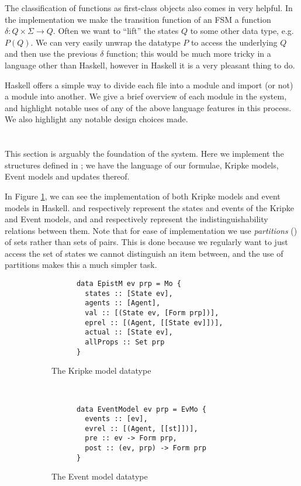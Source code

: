 \documentclass[10pt, a4paper]{report}
\begin{document}
The classification of functions as first-class objects also comes in very
helpful. In the implementation we make the transition function of an FSM a
function $\delta : Q \times \Sigma \rightarrow Q$. Often we want to ``lift'' the
states $Q$ to some other data type, e.g. $P (Q)$. We can very easily unwrap the
datatype $P$ to access the underlying $Q$ and then use the previous $\delta$
function; this would be much more tricky in a language other than Haskell,
however in Haskell it is a very pleasant thing to do.

\bigskip

Haskell offers a simple way to divide each file into a module and import (or
not) a module into another. We give a brief overview of each module in the
system, and highlight notable uses of any of the above language features in this
process. We also highlight any notable design choices made. 

\section{}

This section is arguably the foundation of the system. Here we implement the
structures defined in ; we have the language of our formulae,
Kripke models, Event models and updates thereof.  

In Figure \ref{fig:HaskellModels}, we can see the implementation of both Kripke
models and event models in Haskell.  and 
respectively represent the states and events of the Kripke and Event models, and
 and  respectively represent the
indistinguishability relations between them. Note that for ease of
implementation we use \emph{partitions} (\cite{EREL}) of sets rather than sets
of pairs. This is done because we regularly want to just access the set of
states we cannot distinguish an item between, and the use of partitions makes
this a much simpler task. 

\begin{figure}[h]
  \centering
  \begin{subfigure}[b]{0.5\textwidth}
    \begin{verbatim}
      data EpistM ev prp = Mo {
        states :: [State ev],                  
        agents :: [Agent],              
        val :: [(State ev, [Form prp])],         
        eprel :: [(Agent, [[State ev]])],
        actual :: [State ev],              
        allProps :: Set prp
      }
    \end{verbatim}
    \caption{The Kripke model datatype}
  \end{subfigure}%
~
  \begin{subfigure}[b]{0.5\textwidth}
    \begin{verbatim}
      data EventModel ev prp = EvMo {
        events :: [ev],
        evrel :: [(Agent, [[st]])],
        pre :: ev -> Form prp,
        post :: (ev, prp) -> Form prp
      }
    \end{verbatim}
    \caption{The Event model datatype}
  \end{subfigure}
  \caption{}
  \label{fig:HaskellModels}
\end{figure}
\end{document}
